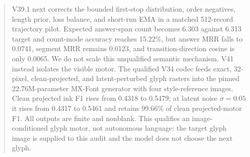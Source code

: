 \documentclass[11pt]{article}
\begin{document}
\begin{abstract}
V39.1 next corrects the bounded first-stop distribution, order negatives,
length prior, loss balance, and short-run EMA in a matched 512-record trajectory
pilot. Expected answer-span count becomes 6.303 against 6.313 target and
count-mode accuracy reaches 15.22\%, but answer MRR falls to 0.0741, segment
MRR remains 0.0123, and transition-direction cosine is only 0.0065. We do not
scale this unqualified semantic mechanism. V41 instead isolates the visible
motor. The qualified V34 codec feeds exact, 32-pixel, clean-projected, and
latent-perturbed glyph rasters into the pinned 22.76M-parameter MX-Font
generator with four style-reference images. Clean projected ink F1 rises from
0.4318 to 0.5479; at latent noise $\sigma=0.05$ it rises from 0.4317 to 0.5461
and retains 99.66\% of clean projected-motor F1. All outputs are finite and
nonblank. This qualifies an image-conditioned glyph motor, not autonomous
language: the target glyph image is supplied to this audit and the model does
not choose the next glyph.


\end{abstract}
\end{document}
